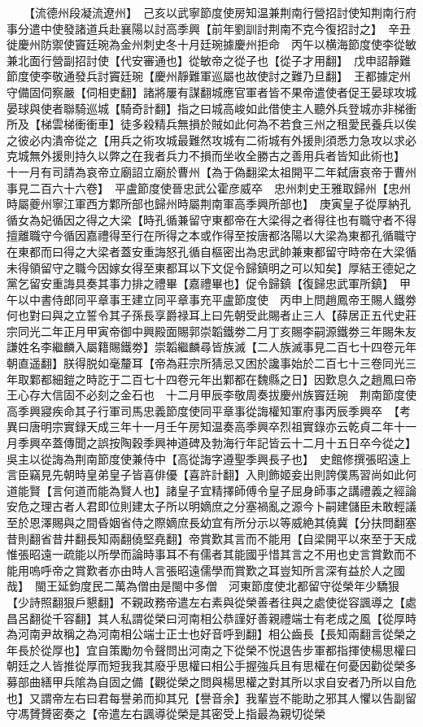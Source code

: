 　　【流德州段凝流遼州】　己亥以武寧節度使房知温兼荆南行營招討使知荆南行府事分遣中使發諸道兵赴襄陽以討高季興【前年劉訓討荆南不克今復招討之】　辛丑徙慶州防禦使竇廷琬為金州刺史冬十月廷琬據慶州拒命　丙午以横海節度使李從敏兼北面行營副招討使【代安審通也】從敏帝之從子也【從子才用翻】　戊申詔靜難節度使李敬通發兵討竇廷琬【慶州靜難軍巡屬也故使討之難乃旦翻】　王都據定州守備固伺察嚴【伺相吏翻】諸將屢有謀翻城應官軍者皆不果帝遣使者促王晏球攻城晏球與使者聯騎巡城【騎奇計翻】指之曰城高峻如此借使主人聽外兵登城亦非梯衝所及【梯雲梯衝衝車】徒多殺精兵無損於賊如此何為不若食三州之租愛民養兵以俟之彼必内潰帝從之【用兵之術攻城最難然攻城有二術城有外援則須悉力急攻以求必克城無外援則持久以弊之在我者兵力不損而坐收全勝古之善用兵者皆知此術也】　十一月有司請為哀帝立廟詔立廟於曹州【為于偽翻梁太祖開平二年弑唐哀帝于曹州事見二百六十六卷】　平盧節度使晉忠武公霍彦威卒　忠州刺史王雅取歸州【忠州時屬夔州寧江軍西方鄴所部也歸州時屬荆南軍高季興所部也】　庚寅皇子從厚納孔循女為妃循因之得之大梁【時孔循兼留守東都帝在大梁得之者得往也有職守者不得擅離職守今循因嘉禮得至行在所得之本或作得至按唐都洛陽以大梁為東都孔循職守在東都而曰得之大梁者蓋安重誨怒孔循自樞密出為忠武帥兼東都留守時帝在大梁循未得領留守之職今因嫁女得至東都耳以下文促令歸鎮明之可以知矣】厚結王德妃之黨乞留安重誨具奏其事力排之禮畢【嘉禮畢也】促令歸鎮【復歸忠武軍所鎮】　甲午以中書侍郎同平章事王建立同平章事充平盧節度使　丙申上問趙鳳帝王賜人鐵劵何也對曰與之立誓令其子孫長享爵禄耳上曰先朝受此賜者止三人【薛居正五代史莊宗同光二年正月甲寅帝御中興殿面賜郭崇韜鐵劵二月丁亥賜李嗣源鐵劵三年賜朱友謙姓名李繼麟入屬籍賜鐵劵】崇韜繼麟尋皆族滅【二人族滅事見二百七十四卷元年朝直遥翻】朕得脱如毫釐耳【帝為莊宗所猜忌又困於讒事始於二百七十三卷同光三年取鄴都細鎧之時訖于二百七十四卷元年出鄴都在魏縣之日】因歎息久之趙鳳曰帝王心存大信固不必刻之金石也　十二月甲辰李敬周奏拔慶州族竇廷琬　荆南節度使高季興寢疾命其子行軍司馬忠義節度使同平章事從誨權知軍府事丙辰季興卒　【考異曰唐明宗實録天成三年十一月壬午房知温奏高季興卒烈祖實錄亦云乾貞二年十一月季興卒蓋傳聞之誤按陶穀季興神道碑及勃海行年記皆云十二月十五日卒今從之】吳主以從誨為荆南節度使兼侍中【高從誨字遵聖季興長子也】　史館修撰張昭遠上言臣竊見先朝時皇弟皇子皆喜俳優【喜許計翻】入則飾姬妾出則誇僕馬習尚如此何道能賢【言何道而能為賢人也】諸皇子宜精擇師傅令皇子屈身師事之講禮義之經論安危之理古者人君即位則建太子所以明嫡庶之分塞禍亂之源今卜嗣建儲臣未敢輕議至於恩澤賜與之間昏姻省侍之際嫡庶長幼宜有所分示以等威絶其僥冀【分扶問翻塞昔則翻省昔井翻長知兩翻僥堅堯翻】帝賞歎其言而不能用【自梁開平以來至于天成惟張昭遠一疏能以所學而論時事耳不有儒者其能國乎惜其言之不用也史言賞歎而不能用嗚呼帝之賞歎者亦由時人言張昭遠儒學而賞歎之耳豈知所言深有益於人之國哉】　閩王延鈞度民二萬為僧由是閩中多僧　河東節度使北都留守從榮年少驕狠【少詩照翻狠戶懇翻】不親政務帝遣左右素與從榮善者往與之處使從容諷導之【處昌呂翻從千容翻】其人私謂從榮曰河南相公恭謹好善親禮端士有老成之風【從厚時為河南尹故稱之為河南相公端士正士也好音呼到翻】相公齒長【長知兩翻言從榮之年長於從厚也】宜自策勵勿令聲問出河南之下從榮不悦退告步軍都指揮使楊思權曰朝廷之人皆推從厚而短我我其廢乎思權曰相公手握強兵且有思權在何憂因勸從榮多募部曲繕甲兵隂為自固之備【觀從榮之問與楊思權之對其所以求自安者乃所以自危也】又謂帝左右曰君每譽弟而抑其兄【譽音余】我輩豈不能助之邪其人懼以告副留守馮贇贇密奏之【帝遣左右諷導從榮是其密受上指最為親切從榮